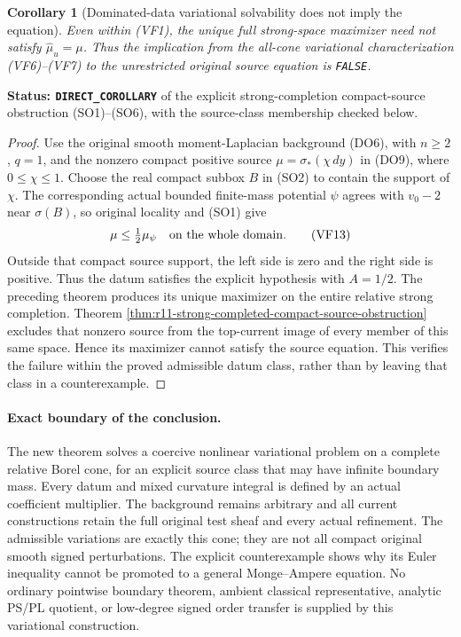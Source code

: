 \documentclass[11pt,a4paper]{article}
\numberwithin{equation}{section}
\newtheorem{corollary}[theorem]{Corollary}
\theoremstyle{definition}
\theoremstyle{remark}
\begin{document}
\begin{corollary}[Dominated-data variational solvability does not imply the equation]
\label{cor:r11-strong-dominated-maximizer-not-equation}
Even within (VF1), the unique full strong-space maximizer need
not satisfy $\widehat\mu_u=\mu$.  Thus the implication from
the all-cone variational characterization (VF6)--(VF7) to
the unrestricted original source equation is \texttt{FALSE}.
\end{corollary}

\noindent\textbf{Status: \texttt{DIRECT\_COROLLARY}} of
the explicit strong-completion compact-source obstruction
(SO1)--(SO6), with the source-class membership checked below.

\begin{proof}
Use the original smooth moment-Laplacian background (DO6),
with $n\geq2$, $q=1$, and the nonzero compact positive source
$\mu=\sigma_*(\chi\,dy)$ in (DO9), where $0\leq\chi\leq1$.
Choose the real compact subbox $B$ in (SO2) to contain the
support of $\chi$.  The corresponding actual bounded
finite-mass potential $\psi$ agrees with $v_0-2$ near
$\sigma(B)$, so original locality and (SO1) give
\[
                              \mu\leq\tfrac12\mu_\psi
                                      \quad\hbox{on the whole domain}.
 \tag{VF13}
\]
Outside that compact source support, the left side is zero
and the right side is positive.  Thus the datum satisfies
the explicit hypothesis with $A=1/2$.  The preceding theorem
produces its unique maximizer on the entire relative strong
completion.  Theorem
\ref{thm:r11-strong-completed-compact-source-obstruction}
excludes that nonzero source from the top-current image of
every member of this same space.  Hence its maximizer cannot
satisfy the source equation.  This verifies the failure within
the proved admissible datum class, rather than by leaving
that class in a counterexample.
\end{proof}

\paragraph{Exact boundary of the conclusion.}
The new theorem solves a coercive nonlinear variational problem
on a complete relative Borel cone, for an explicit source class
that may have infinite boundary mass.  Every datum and mixed
curvature integral is defined by an actual coefficient multiplier.
The background remains arbitrary and all current constructions
retain the full original test sheaf and every actual refinement.
The admissible variations are exactly this cone; they are not
all compact original smooth signed perturbations.  The explicit
counterexample shows why its Euler inequality cannot be promoted
to a general Monge--Ampere equation.  No ordinary pointwise
boundary theorem, ambient classical representative, analytic
PS/PL quotient, or low-degree signed order transfer is supplied
by this variational construction.
\end{document}
